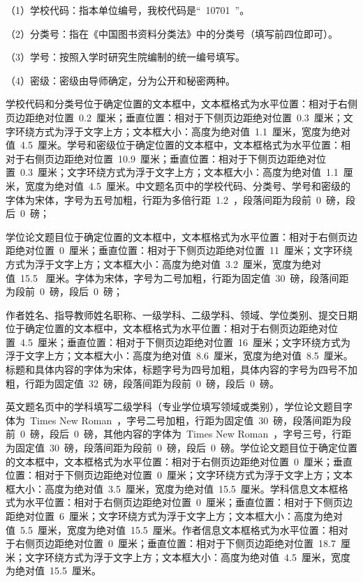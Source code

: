 （1）学校代码：指本单位编号，我校代码是“~10701~”。

（2）分类号：指在《中国图书资料分类法》中的分类号（填写前四位即可）。

（3）学号：按照入学时研究生院编制的统一编号填写。

（4）密级：密级由导师确定，分为公开和秘密两种。

学校代码和分类号位于确定位置的文本框中，文本框格式为水平位置：相对于右侧页边距绝对位置~0.2~厘米；垂直位置：相对于下侧页边距绝对位置~0.3~厘米；文字环绕方式为浮于文字上方；文本框大小：高度为绝对值~1.1~厘米，宽度为绝对值~4.5~厘米。学号和密级位于确定位置的文本框中，文本框格式为水平位置：相对于右侧页边距绝对位置~10.9~厘米；垂直位置：相对于下侧页边距绝对位置~0.3~厘米；文字环绕方式为浮于文字上方；文本框大小：高度为绝对值~1.1~厘米，宽度为绝对值~4.5~厘米。中文题名页中的学校代码、分类号、学号和密级的字体为宋体，字号为五号加粗，行距为多倍行距~1.2~，段落间距为段前~0~磅，段后~0~磅；

学位论文题目位于确定位置的文本框中，文本框格式为水平位置：相对于右侧页边距绝对位置~0~厘米；垂直位置：相对于下侧页边距绝对位置~11~厘米；文字环绕方式为浮于文字上方；文本框大小：高度为绝对值~3.2~厘米，宽度为绝对值~15.5~ 厘米。字体为宋体，字号为二号加粗，行距为固定值~30~磅，段落间距为段前~0~磅，段后~0~磅；

作者姓名、指导教师姓名职称、一级学科、二级学科、领域、学位类别、提交日期位于确定位置的文本框中，文本框格式为水平位置：相对于右侧页边距绝对位置~4.5~厘米；垂直位置：相对于下侧页边距绝对位置~16~厘米；文字环绕方式为浮于文字上方；文本框大小：高度为绝对值~8.6~厘米，宽度为绝对值~8.5~厘米。标题和具体内容的字体为宋体，标题字号为四号加粗，具体内容的字号为四号不加粗，行距为固定值~32~磅，段落间距为段前~0~磅，段后~0~磅。

英文题名页中的学科填写二级学科（专业学位填写领域或类别），学位论文题目字体为~Times New Roman~，字号二号加粗，行距为固定值~30~磅，段落间距为段前~0~磅，段后~0~磅，其他内容的字体为~Times New Roman~，字号三号，行距为固定值~30~磅，段落间距为段前~0~磅，段后~0~磅。学位论文题目位于确定位置的文本框中，文本框格式为水平位置：相对于右侧页边距绝对位置~0~厘米；垂直位置：相对于下侧页边距绝对位置~0~厘米；文字环绕方式为浮于文字上方；文本框大小：高度为绝对值~3.5~厘米，宽度为绝对值~15.5~厘米。学科信息文本框格式为水平位置：相对于右侧页边距绝对位置~0~厘米；垂直位置：相对于下侧页边距绝对位置~6~厘米；文字环绕方式为浮于文字上方；文本框大小：高度为绝对值~5.5~厘米，宽度为绝对值~15.5~厘米。作者信息文本框格式为水平位置：相对于右侧页边距绝对位置~0~厘米；垂直位置：相对于下侧页边距绝对位置~18.7~厘米；文字环绕方式为浮于文字上方；文本框大小：高度为绝对值~4.5~厘米，宽度为绝对值~15.5~厘米。

